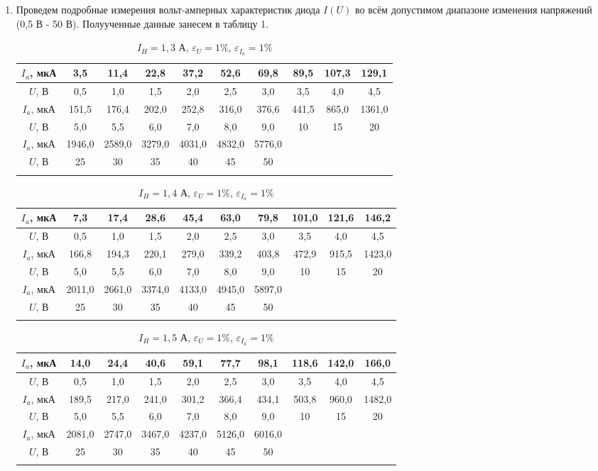 \documentclass[a4paper, 12pt]{article}%
\begin{document}
	\begin{enumerate}
	
	\item Проведем подробные измерения вольт-амперных характеристик диода $I(U)$ во всём допустимом диапазоне изменения напряжений (0,5 В - 50 В). Полуученные данные занесем в таблицу 1.
	
	
	\begin{longtable} {|c|c|c|c|c|c|c|c|c|c|}
		\hline
		$I_a$, мкА & 3,5 & 11,4 & 22,8 & 37,2 & 52,6 & 69,8 & 89,5 & 107,3  & 129,1\\ \hline
		$U$, В & 0,5 & 1,0 & 1,5 & 2,0 & 2,5 & 3,0 & 3,5  & 4,0 & 4,5\\ \hline
		\hline
		$I_a$, мкА & 151,5 & 176,4 & 202,0 & 252,8 & 316,0 & 376,6 & 441,5 & 865,0 & 1361,0 \\ \hline
		$U$, В & 5,0 & 5,5 & 6,0 & 7,0 & 8,0 & 9,0 & 10 & 15 & 20\\ \hline
		\hline
		$I_a$, мкА & 1946,0 & 2589,0 & 3279,0 & 4031,0 & 4832,0 & 5776,0 & & &\\ \hline
		$U$, В & 25 & 30 & 35 & 40 & 45 & 50 & & &\\ \hline
		\caption{$I_H = 1,3$ А, $\varepsilon_U = 1\%$, $\varepsilon_{I_a} = 1\%$}
	\end{longtable}
	
	
	\begin{longtable} {|c|c|c|c|c|c|c|c|c|c|}
		\hline
		$I_a$, мкА & 7,3 & 17,4 & 28,6 & 45,4 & 63,0 & 79,8 & 101,0 & 121,6  & 146,2\\ \hline
		$U$, В & 0,5 & 1,0 & 1,5 & 2,0 & 2,5 & 3,0 & 3,5  & 4,0 & 4,5\\ \hline
		\hline
		$I_a$, мкА & 166,8 & 194,3 & 220,1 & 279,0 & 339,2 & 403,8 & 472,9 & 915,5 & 1423,0 \\ \hline
		$U$, В & 5,0 & 5,5 & 6,0 & 7,0 & 8,0 & 9,0 & 10 & 15 & 20\\ \hline
		\hline
		$I_a$, мкА & 2011,0 & 2661,0 & 3374,0 & 4133,0 & 4945,0 & 5897,0 & & &\\ \hline
		$U$, В & 25 & 30 & 35 & 40 & 45 & 50 & & &\\ \hline
		\caption{$I_H = 1,4$ А, $\varepsilon_U = 1\%$, $\varepsilon_{I_a} = 1\%$}
	\end{longtable}
	
	
	\begin{longtable} {|c|c|c|c|c|c|c|c|c|c|}
		\hline
		$I_a$, мкА & 14,0 & 24,4 & 40,6 & 59,1 & 77,7 & 98,1 & 118,6 & 142,0 & 166,0\\ \hline
		$U$, В & 0,5 & 1,0 & 1,5 & 2,0 & 2,5 & 3,0 & 3,5  & 4,0 & 4,5\\ \hline
		\hline
		$I_a$, мкА & 189,5 & 217,0 & 241,0 & 301,2 & 366,4 & 434,1 & 503,8 & 960,0 & 1482,0 \\ \hline
		$U$, В & 5,0 & 5,5 & 6,0 & 7,0 & 8,0 & 9,0 & 10 & 15 & 20\\ \hline
		\hline
		$I_a$, мкА & 2081,0 & 2747,0 & 3467,0 & 4237,0 & 5126,0 & 6016,0 & & &\\ \hline
		$U$, В & 25 & 30 & 35 & 40 & 45 & 50 & & &\\ \hline
		\caption{$I_H = 1,5$ А, $\varepsilon_U = 1\%$, $\varepsilon_{I_a} = 1\%$}
	\end{longtable}
	

\end{enumerate}
\end{document}
